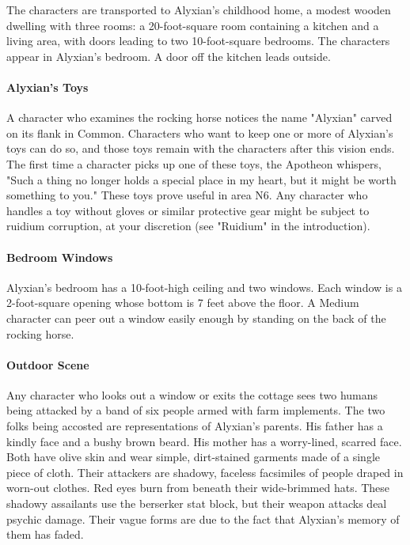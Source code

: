 \documentclass[10pt,a4paper,twoside,bg=print,twocolumn,openany,nodeprecatedcode]{dndbook}
\begin{document}
The characters are transported to Alyxian's childhood home, a modest wooden dwelling with three rooms: a 20-foot-square room containing a kitchen and a living area, with doors leading to two 10-foot-square bedrooms. The characters appear in Alyxian's bedroom. A door off the kitchen leads outside.

\paragraph{Alyxian's Toys}
A character who examines the rocking horse notices the name "Alyxian" carved on its flank in Common. Characters who want to keep one or more of Alyxian's toys can do so, and those toys remain with the characters after this vision ends. The first time a character picks up one of these toys, the Apotheon whispers, "Such a thing no longer holds a special place in my heart, but it might be worth something to you." These toys prove useful in area N6. Any character who handles a toy without gloves or similar protective gear might be subject to ruidium corruption, at your discretion (see "Ruidium" in the introduction).

\paragraph{Bedroom Windows}
Alyxian's bedroom has a 10-foot-high ceiling and two windows. Each window is a 2-foot-square opening whose bottom is 7 feet above the floor. A Medium character can peer out a window easily enough by standing on the back of the rocking horse.

\paragraph{Outdoor Scene}
Any character who looks out a window or exits the cottage sees two humans being attacked by a band of six people armed with farm implements. The two folks being accosted are representations of Alyxian's parents. His father has a kindly face and a bushy brown beard. His mother has a worry-lined, scarred face. Both have olive skin and wear simple, dirt-stained garments made of a single piece of cloth. Their attackers are shadowy, faceless facsimiles of people draped in worn-out clothes. Red eyes burn from beneath their wide-brimmed hats. These shadowy assailants use the berserker stat block, but their weapon attacks deal psychic damage. Their vague forms are due to the fact that Alyxian's memory of them has faded.
\end{document}
